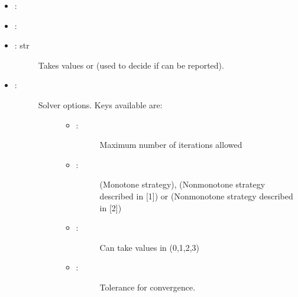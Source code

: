 \documentclass[a4paper,10pt,english]{sphinxmanual}
\begin{document}
\begin{fulllineitems}
\begin{itemize}
\begin{description}
\end{description}

\item {} 
: 

\item {} 
: 

\item {} \begin{description}
\item[{: str}] \leavevmode
Takes values  or  (used to decide if  can 
be reported).

\end{description}

\item {} \begin{description}
\item[{: }] \leavevmode\begin{description}
\item[{Solver options. Keys available are:}] \leavevmode\begin{itemize}
\item {} \begin{description}
\item[{: }] \leavevmode
Maximum number of iterations allowed

\end{description}

\item {} \begin{description}
\item[{: }] \leavevmode
{} (Monotone strategy),  (Nonmonotone strategy 
described in {[}1{]}) or  (Nonmonotone strategy described 
in {[}2{]})

\end{description}

\item {} \begin{description}
\item[{: }] \leavevmode
Can take values in (0,1,2,3)

\end{description}

\item {} \begin{description}
\item[{: }] \leavevmode
Tolerance for convergence.


\end{description}
\end{itemize}
\end{description}
\end{description}
\end{itemize}
\end{fulllineitems}
\end{document}
